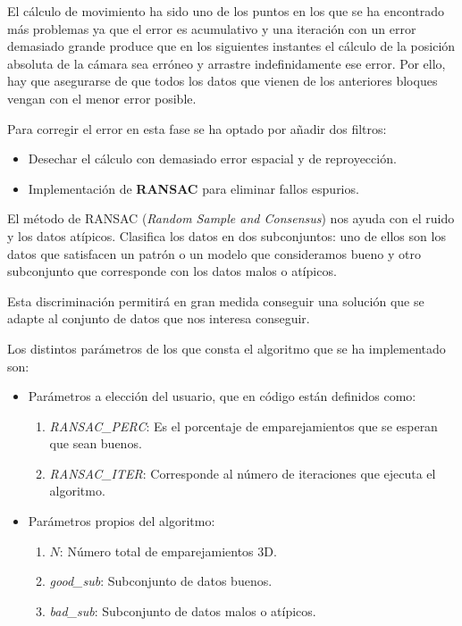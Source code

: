 El cálculo de movimiento ha sido uno de los puntos en los que se ha encontrado más problemas ya que el error es acumulativo y una iteración con un error demasiado grande produce que en los siguientes instantes el cálculo de la posición absoluta de la cámara sea erróneo y arrastre indefinidamente ese error. Por ello, hay que asegurarse de que todos los datos que vienen de los anteriores bloques vengan con el menor error posible.

Para corregir el error en esta fase se ha optado por añadir dos filtros:

\begin{itemize}
\item Desechar el cálculo con demasiado error espacial y de reproyección.
\item Implementación de \textbf{RANSAC} para eliminar fallos espurios.
\end{itemize}

El método de RANSAC (\textit{Random Sample and Consensus}) nos ayuda con el ruido y los datos atípicos. Clasifica los datos en dos subconjuntos: uno de ellos son los datos que satisfacen un patrón o un modelo que consideramos bueno y otro subconjunto que corresponde con los datos malos o atípicos.

Esta discriminación permitirá en gran medida conseguir una solución que se adapte al conjunto de datos que nos interesa conseguir.

Los distintos parámetros de los que consta el algoritmo que se ha implementado son:

\begin{itemize}
\item Parámetros a elección del usuario, que en código están definidos como:

\begin{enumerate}
\item \textit{RANSAC\_PERC}: Es el porcentaje de emparejamientos que se esperan que sean buenos.
\item \textit{RANSAC\_ITER}: Corresponde al número de iteraciones que ejecuta el algoritmo.
\end{enumerate}
\item Parámetros propios del algoritmo:

\begin{enumerate}
\item $N$: Número total de emparejamientos 3D.
\item \textit{good\_sub}: Subconjunto de datos buenos.
\item \textit{bad\_sub}: Subconjunto de datos malos o atípicos.
\end{enumerate}
\end{itemize}

